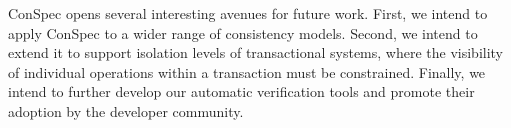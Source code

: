 \documentclass[journal,compsoc]{IEEEtran}
\begin{document}
ConSpec opens several interesting avenues for future work. First, we intend to apply ConSpec to a wider range of consistency models. Second, we intend to extend it to support isolation levels of transactional systems, where the visibility of individual operations within a transaction must be constrained. Finally, we intend to further develop our automatic verification tools and promote their adoption by the developer community.





%
\end{document}
